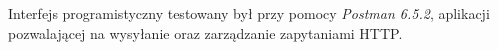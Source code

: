 \documentclass[eng,printmode,openany]{mgr}
\begin{document}
Interfejs programistyczny testowany był przy pomocy \textit{Postman 6.5.2}, aplikacji pozwalającej na wysyłanie oraz zarządzanie zapytaniami HTTP.




\end{document}
